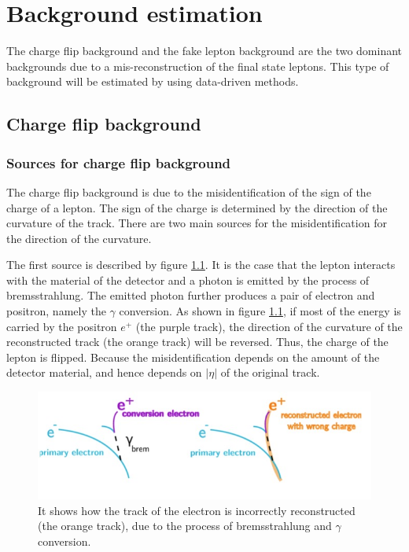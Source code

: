 \chapter{Background estimation}
\label{ch:BG}

The charge flip background and the fake lepton background are the two dominant backgrounds due to a mis-reconstruction of the final state leptons.
This type of background will be estimated by using data-driven methods.

\section{Charge flip background}
\label{sec:charge_flip_background}
\subsection{Sources for charge flip background}
The charge flip background is due to the misidentification of the sign of the charge of a lepton.
The sign of the charge is determined by the direction of the curvature of the track.
There are two main sources for the misidentification for the direction of the curvature.

The first source is described by figure \ref{fig:charge_flip_bremsstrahlung}.
It is the case that the lepton interacts with the material of the detector and a photon is emitted by the process of bremsstrahlung.
The emitted photon further produces a pair of electron and positron, namely the $\gamma$ conversion.
As shown in figure \ref{fig:charge_flip_bremsstrahlung}, if most of the energy is carried by the positron $e^{+}$ (the purple track), the direction of the curvature of the reconstructed track (the orange track) will be reversed.
Thus, the charge of the lepton is flipped.
Because the misidentification depends on the amount of the detector material, and hence depends on $|\eta|$ of the original track.

\begin{figure}
\centering
\includegraphics[width=\textwidth]{data/photo/charge_flip/Brem.jpg}
\caption{It shows how the track of the electron is incorrectly reconstructed (the orange track), due to the process of bremsstrahlung and $\gamma$ conversion.}
\label{fig:charge_flip_bremsstrahlung}
\end{figure}

